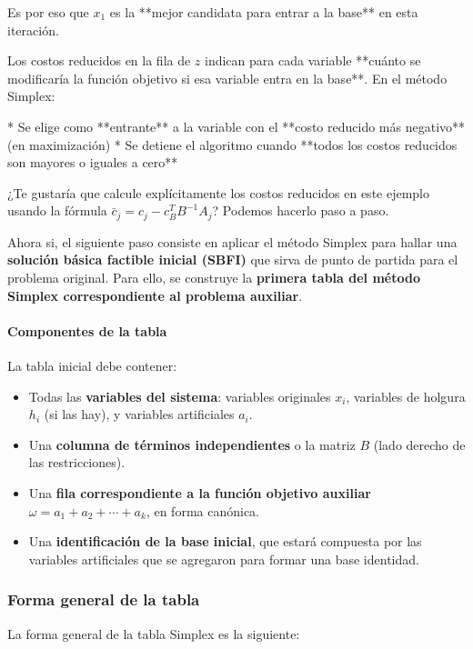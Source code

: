 Es por eso que $x_1$ es la **mejor candidata para entrar a la base** en esta iteración.



Los costos reducidos en la fila de $z$ indican para cada variable **cuánto se modificaría la función objetivo si esa variable entra en la base**. En el método Simplex:

* Se elige como **entrante** a la variable con el **costo reducido más negativo** (en maximización)
* Se detiene el algoritmo cuando **todos los costos reducidos son mayores o iguales a cero**

¿Te gustaría que calcule explícitamente los costos reducidos en este ejemplo usando la fórmula $\bar{c}_j = c_j - c_B^T B^{-1} A_j$? Podemos hacerlo paso a paso.


Ahora si, el siguiente paso consiste en aplicar el método Simplex para hallar una \textbf{solución básica factible inicial (SBFI)} que sirva de punto de partida para el problema original. Para ello, se construye la \textbf{primera tabla del método Simplex correspondiente al problema auxiliar}.

\paragraph{Componentes de la tabla}

La tabla inicial debe contener:

\begin{itemize}
  \item Todas las \textbf{variables del sistema}: variables originales \(x_i\), variables de holgura \(h_i\) (si las hay), y variables artificiales \(a_i\).
  \item Una \textbf{columna de términos independientes} o la matriz \(B\) (lado derecho de las restricciones).
  \item Una \textbf{fila correspondiente a la función objetivo auxiliar} \(\omega = a_1 + a_2 + \cdots + a_k\), en forma canónica.
  \item Una \textbf{identificación de la base inicial}, que estará compuesta por las variables artificiales que se agregaron para formar una base identidad.
\end{itemize}

\subsubsection*{Forma general de la tabla}

La forma general de la tabla Simplex es la siguiente:

